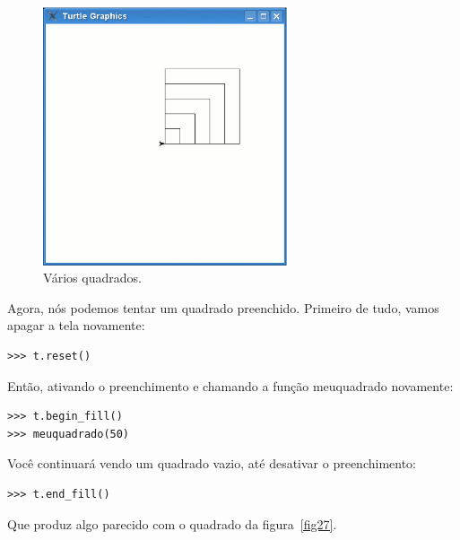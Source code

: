 \begin{figure}
\begin{center}
\includegraphics[width=72mm]{eps/figure26.eps}
\end{center}
\caption{Vários quadrados.}\label{fig26}
\end{figure}

\noindent
Agora, nós podemos tentar um quadrado preenchido. Primeiro de tudo, vamos apagar a tela novamente:

\begin{listing}
\begin{verbatim}
>>> t.reset()
\end{verbatim}
\end{listing}

\noindent
Então, ativando o preenchimento e chamando a função meuquadrado novamente:

\begin{listing}
\begin{verbatim}
>>> t.begin_fill()
>>> meuquadrado(50)
\end{verbatim}
\end{listing}

\noindent
Você continuará vendo um quadrado vazio, até desativar o preenchimento:

\begin{listing}
\begin{verbatim}
>>> t.end_fill()
\end{verbatim}
\end{listing}

\noindent
Que produz algo parecido com o quadrado da figura~\ref{fig27}.

